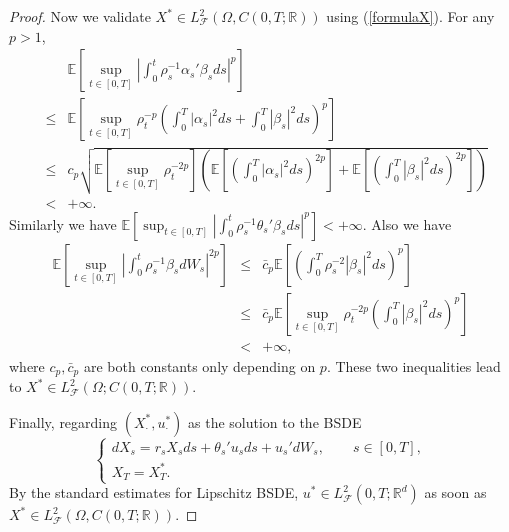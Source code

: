 \documentclass[final]{siamltex}
\begin{document}
\begin{proof}
Now we validate  $X^*\in L_{{\mathcal F}}^2(\Omega, C(0,T;{\mathbb{R}}))$ using (\ref{formulaX}). For
any $p>1$,
\begin{eqnarray*}
&&{\mathbb{E}\left[{\sup_{t\in [0,T]} \left| \int_0^t \rho_s^{-1}\alpha_s'\beta_s
ds\right|^p}\right]}\\
&\le&{\mathbb{E}\left[{\sup_{t\in [0,T] }\rho_t^{-p} \left(  \int_0^T|\alpha_s|^2ds+\int_0^T|\beta_s|^2ds\right)^p}\right]}\\
&\le&c_p\sqrt{{\mathbb{E}\left[{\sup_{t\in [0,T] }\rho_t^{-2p}}\right]}\left({\mathbb{E}\left[{\left(  \int_0^T|\alpha_s|^2ds\right)^{2p}}\right]} +{\mathbb{E}\left[{\left(\int_0^T|\beta_s|^2ds\right)^{2p}}\right]}\right)}\\
&<&+\infty.
\end{eqnarray*}
Similarly we have ${\mathbb{E}\left[{\sup_{t\in [0,T]} \left| \int_0^t \rho_s^{-1}\theta_s'\beta_sds\right|^p}\right]}<+\infty$. Also we have
\begin{eqnarray*}
{\mathbb{E}\left[{\sup_{t\in [0,T]} \left| \int_0^t \rho_s^{-1}\beta_s
dW_s\right|^{2p}}\right]}
&\le&\bar c_p{\mathbb{E}\left[{\left(\int_0^T\rho_s^{-2}|\beta_s|^2 ds\right)^p}\right]}\\
&\le&\bar c_p{\mathbb{E}\left[{\sup_{t\in [0,T]} \rho_t^{-2p} \left(\int_0^T|\beta_s|^2 ds\right)^p}\right]}\\
&<&+\infty,
\end{eqnarray*}
where $c_p,\bar c_p$ are both constants only depending on $p$. These two inequalities lead to $X^*\in L^2_{{\mathcal F}}(\Omega; C(0, T; {\mathbb{R}}))$.

Finally, regarding $(X^*_\cdot, u^*_\cdot)$ as the solution to the BSDE
\begin{equation}
 \left\{\begin{array}{l}
         dX_s=r_s X_sds+\theta_s'u_sds+u_s'dW_s,\qquad s\in [0,T],\\
     X_T=X^*_T.
        \end{array}
 \right.
\end{equation}
By the standard estimates for Lipschitz BSDE, $u^*\in L_{{\mathcal F}}^2(0,T;{\mathbb{R}}^d)$
as soon as $X^*\in L_{{\mathcal F}}^2(\Omega, C(0,T;{\mathbb{R}}))$.
\end{proof}
\end{document}
